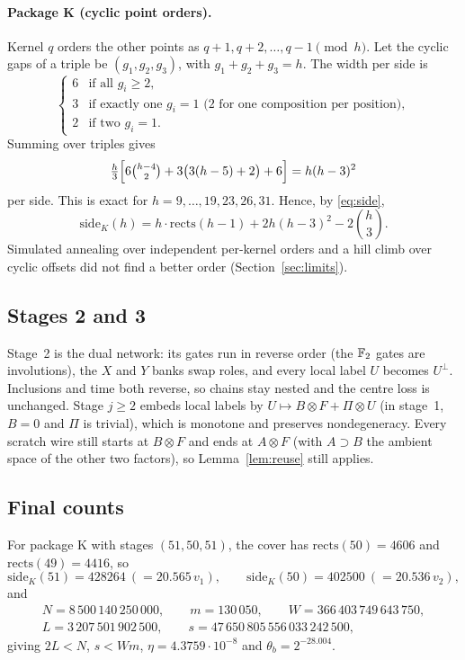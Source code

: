 \paragraph{Package K (cyclic point orders).} Kernel $q$ orders the other points as $q+1, q+2, \dots, q-1 \pmod h$. Let the cyclic gaps of a triple be $(g_1,g_2,g_3)$, with $g_1+g_2+g_3 = h$. The width per side is
\[
\begin{cases}
6 & \text{if all } g_i\ge 2,\\
3 & \text{if exactly one } g_i = 1 \text{ (2 for one composition per position)},\\
2 & \text{if two } g_i = 1 .
\end{cases}
\]
Summing over triples gives
\[
\tfrac h3\Bigl[6\tbinom{h-4}{2} + 3\bigl(3(h-5)+2\bigr) + 6\Bigr] = h(h-3)^2
\]
per side. This is exact for $h = 9,\dots,19, 23, 26, 31$. Hence, by \eqref{eq:side},
\[
\mathrm{side}_K(h) = h\cdot\mathrm{rects}(h-1) + 2h(h-3)^2 - 2\binom h3 .
\]
Simulated annealing over independent per-kernel orders and a hill climb over cyclic offsets did not find a better order (Section~\ref{sec:limits}).

\subsection{Stages 2 and 3}

Stage~2 is the dual network: its gates run in reverse order (the $\mathbb{F}_2$ gates are involutions), the $X$ and $Y$ banks swap roles, and every local label $U$ becomes $U^\perp$. Inclusions and time both reverse, so chains stay nested and the centre loss is unchanged. Stage $j\ge 2$ embeds local labels by $U\mapsto B\otimes F + \Pi\otimes U$ (in stage~1, $B = 0$ and $\Pi$ is trivial), which is monotone and preserves nondegeneracy. Every scratch wire still starts at $B\otimes F$ and ends at $A\otimes F$ (with $A\supset B$ the ambient space of the other two factors), so Lemma~\ref{lem:reuse} still applies.

\subsection{Final counts}

For package K with stages $(51,50,51)$, the cover has $\mathrm{rects}(50) = 4606$ and $\mathrm{rects}(49) = 4416$, so
\[
\mathrm{side}_K(51) = 428264 \ (= 20.565\,v_1), \qquad \mathrm{side}_K(50) = 402500 \ (= 20.536\,v_2),
\]
and
\begin{gather*}
N = 8\,500\,140\,250\,000,\qquad m = 130\,050,\qquad W = 366\,403\,749\,643\,750,\\
L = 3\,207\,501\,902\,500,\qquad s = 47\,650\,805\,556\,033\,242\,500,
\end{gather*}
giving $2L < N$, $s < Wm$, $\eta = 4.3759\cdot 10^{-8}$ and $\theta_b = 2^{-28.004}$.
